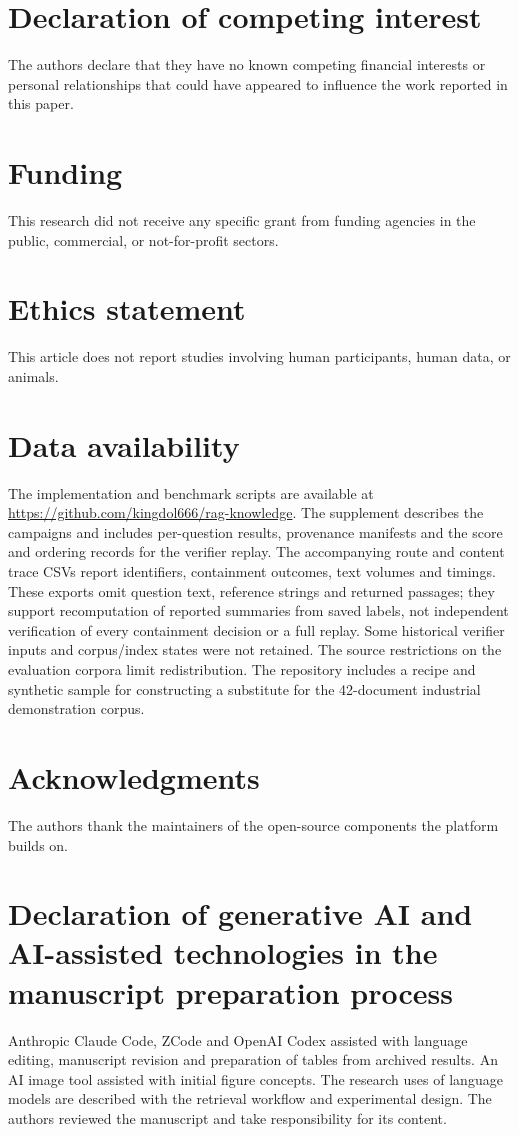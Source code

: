 \section*{Declaration of competing interest}
The authors declare that they have no known competing financial interests
or personal relationships that could have appeared to influence the work
reported in this paper.

\section*{Funding}
This research did not receive any specific grant from funding agencies in
the public, commercial, or not-for-profit sectors. 
\section*{Ethics statement}
This article does not report studies involving human participants, human
data, or animals.

\section*{Data availability}
The implementation and benchmark scripts are available at
\url{https://github.com/kingdol666/rag-knowledge}. The supplement describes
the campaigns and includes per-question results, provenance manifests and
the score and ordering records for the verifier replay. The accompanying
route and content trace CSVs report identifiers, containment outcomes, text
volumes and timings. These exports omit question text, reference strings and
returned passages; they support recomputation of reported summaries from saved
labels, not independent verification of every containment decision or a full
replay. Some historical verifier inputs and corpus/index states were not
retained. The source restrictions on the evaluation corpora limit
redistribution. The repository includes a recipe and synthetic sample for
constructing a substitute for the 42-document industrial demonstration
corpus.

\section*{Acknowledgments}
The authors thank the maintainers of the open-source components the platform
builds on. 
\section*{Declaration of generative AI and AI-assisted technologies in the manuscript preparation process}
Anthropic Claude Code, ZCode and OpenAI Codex assisted with language editing,
manuscript revision and preparation of tables from archived results. An AI
image tool assisted with initial figure concepts. The research uses of
language models are described with the retrieval workflow and experimental
design. The authors reviewed the manuscript and take responsibility for its
content.


